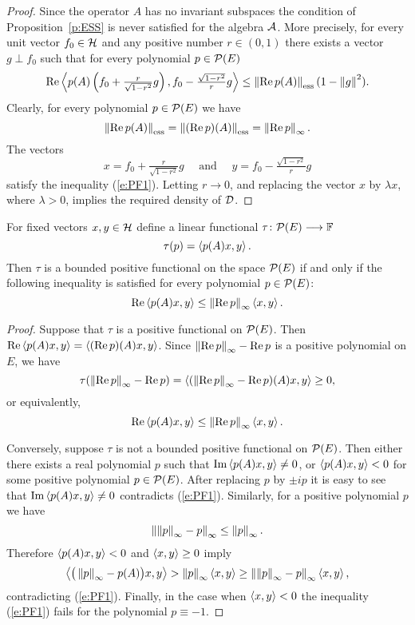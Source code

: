 \begin{proof}
Since the operator $A$ has no invariant subspaces the condition
of Proposition~\ref{p:ESS} is never satisfied for the algebra
${\cal A}$. More precisely, for every unit vector $f_0\in{\cal H}$ and any
positive number $r\in(0,1)$ there exists a vector $g\perp{}f_0$
such that for every polynomial $p\in{\cal{P}}(E)$
\[ \RE\seq{p(A)\left(f_0+\tfrac{r}{\sqrt{1-r^2}}g\right),
                  f_0-\tfrac{\sqrt{1-r^2}}{r}g} \leq
   \essnorm{\RE{}p(A)}(1 - \norm{g}^2). \]
Clearly, for every polynomial $p\in{\cal{P}}(E)$ we have
\[ \essnorm{\RE p(A)} = \essnorm{(\RE p)(A)} = \norm{\RE p}_\infty. \]
The vectors
\[ x=f_0+\tfrac{r}{\sqrt{1-r^2}}g
   \quad \text{ and } \quad
   y=f_0-\tfrac{\sqrt{1-r^2}}{r}g \]
satisfy the inequality (\ref{e:PF1}). Letting $r\to0$, and
replacing the vector $x$ by $\lambda{x}$, where $\lambda>0$,
implies the required density of ${\cal{D}}$.
\end{proof}

\begin{lem} \label{l:PF2}
For fixed vectors $x,y\in{\cal H}$ define a linear functional
$\tau\colon{\cal{P}}(E)\longrightarrow\mathbb F$
\[ \tau(p) = \left<p(A)x,y\right>. \]
Then $\tau$ is a bounded positive functional on the space
${\cal{P}}(E)$ if and only if the following inequality is satisfied
for every polynomial $p\in{\cal{P}}(E)$:
\[ \operatorname{Re}\left<p(A)x,y\right> \leq \left\Vert\operatorname{Re} p\right\Vert_\infty\left<x,y\right>. \]
\end{lem}

\begin{proof}
Suppose that $\tau$ is a positive functional on ${\cal{P}}(E)$. Then
$\operatorname{Re} \left<p(A)x,y\right> = \left<(\operatorname{Re} p)(A)x,y\right>$. Since $\left\Vert\operatorname{Re}
p\right\Vert_\infty - \operatorname{Re} p$ is a positive polynomial on $E$, we have
\[ \tau(\left\Vert\operatorname{Re} p\right\Vert_\infty - \operatorname{Re} p) =
   \left<(\left\Vert\operatorname{Re} p\right\Vert_\infty - \operatorname{Re} p)(A)x, y\right> \geq 0, \]
or equivalently,
\[ \operatorname{Re}\left<p(A)x,y\right> \leq \left\Vert\operatorname{Re} p\right\Vert_\infty\left<x,y\right>. \]

Conversely, suppose $\tau$ is not a bounded positive functional
on ${\cal{P}}(E)$. Then either there exists a real polynomial $p$ such
that $\operatorname{Im}\left<p(A)x,y\right>\neq0$, or $\left<p(A)x,y\right><0$ for some
positive polynomial $p\in{\cal{P}}(E)$. After replacing $p$ by $\pm i
p$ it is easy to see that $\operatorname{Im}\left<p(A)x,y\right>\neq0$ contradicts
(\ref{e:PF1}). Similarly, for a positive polynomial $p$ we have
\[ \left\Vert\left\Vert p\right\Vert_\infty-p\right\Vert_\infty \leq \left\Vert p\right\Vert_\infty. \]
Therefore $\left<p(A)x,y\right><0$ and $\left<x,y\right>\geq0$ imply
\[ \left< \big(\left\Vert p\right\Vert_\infty-p(A)\big)x,y\right> > \left\Vert p\right\Vert_\infty\left<x,y\right>
   \geq  \left\Vert\left\Vert p\right\Vert_\infty-p\right\Vert_\infty\left<x,y\right>, \]
contradicting (\ref{e:PF1}). Finally, in the case when
$\left<x,y\right><0$ the inequality (\ref{e:PF1}) fails for the
polynomial $p\equiv-1$.
\end{proof}

